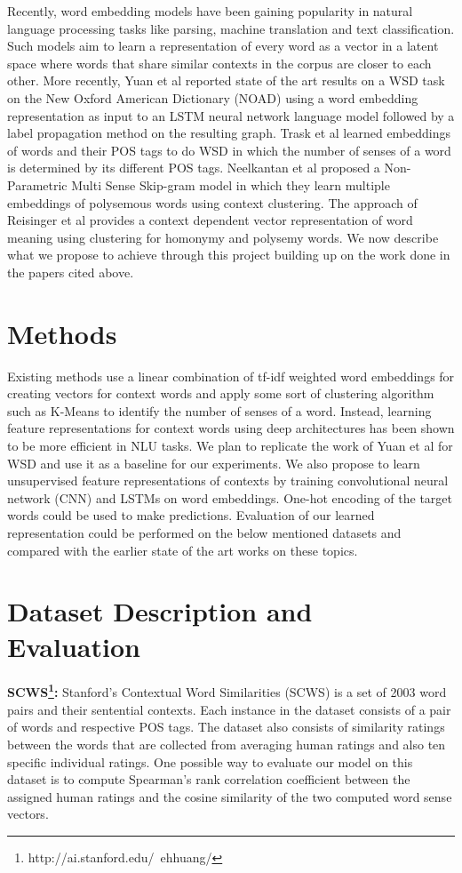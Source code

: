 \documentclass{article}
\begin{document}
Recently, word embedding models \cite{mikolov2013efficient} have been gaining popularity in natural language processing tasks like parsing, machine translation and text classification. Such models aim to learn a representation of every word as a vector in a latent space where words that share similar contexts in the corpus are closer to each other. More recently, Yuan et al \cite{yuan2016word} reported state of the art results on a WSD task on the New Oxford American Dictionary (NOAD) using a word embedding representation as input to an LSTM neural network language model followed by a label propagation method on the resulting graph. Trask et al \cite{trask2015sense2vec} learned embeddings of words and their POS tags to do WSD in which the number of senses of a word is determined by its different POS tags. Neelkantan et al \cite{neelakantan2015efficient} proposed a Non-Parametric Multi Sense Skip-gram model in which they learn multiple embeddings of polysemous words using context clustering. The approach of Reisinger et al\cite{reisinger2010multi} provides a context dependent vector representation of word meaning using clustering for homonymy and polysemy words. We now describe what we propose to achieve through this project building up on the work done in the papers cited above.

\section{Methods}
Existing methods use a linear combination of tf-idf weighted word embeddings for creating vectors for context words and apply some sort of clustering algorithm such as K-Means to identify the number of senses of a word. Instead, learning feature representations for context words using deep architectures has been shown to be more efficient in NLU tasks. We plan to replicate the work of Yuan et al \cite{yuan2016word} for WSD and use it as a baseline for our experiments. We also propose to learn unsupervised feature representations of contexts by training convolutional neural network (CNN) and LSTMs on word embeddings. One-hot encoding of the target words could be used to make predictions. Evaluation of our learned representation could be performed on the below mentioned datasets and compared with the earlier state of the art works on these topics.


\section{Dataset Description and Evaluation}
\textbf{SCWS\footnote{http://ai.stanford.edu/~ehhuang/}:} Stanford’s Contextual Word Similarities (SCWS) is a set of 2003 word pairs and their sentential contexts. Each instance in the dataset consists of a pair of words and respective POS tags. The dataset also consists of similarity ratings between the words that are collected from averaging human ratings and also ten specific individual ratings. One possible way to evaluate our model on this dataset is to compute Spearman’s rank correlation coefficient between the assigned human ratings and the cosine similarity of the two computed word sense vectors.\\
\end{document}
